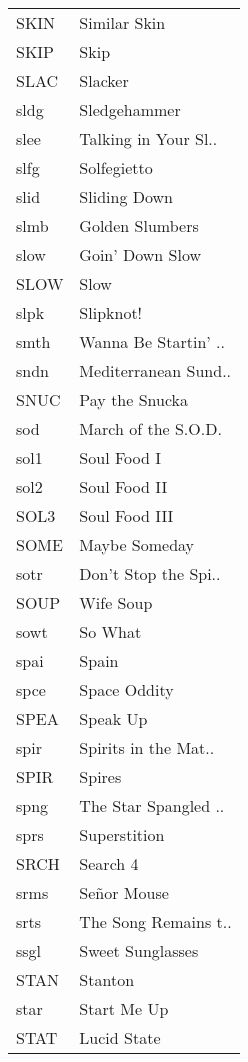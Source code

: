 \begin{supertabular}{ll}
 SKIN &          Similar Skin \\
 SKIP &                  Skip \\
 SLAC &               Slacker \\
 sldg &          Sledgehammer \\
 slee &  Talking in Your Sl.. \\
 slfg &           Solfegietto \\
 slid &          Sliding Down \\
 slmb &       Golden Slumbers \\
 slow &       Goin' Down Slow \\
 SLOW &                  Slow \\
 slpk &             Slipknot! \\
 smth &  Wanna Be Startin' .. \\
 sndn &  Mediterranean Sund.. \\
 SNUC &        Pay the Snucka \\
  sod &   March of the S.O.D. \\
 sol1 &           Soul Food I \\
 sol2 &          Soul Food II \\
 SOL3 &         Soul Food III \\
 SOME &         Maybe Someday \\
 sotr &  Don't Stop the Spi.. \\
 SOUP &             Wife Soup \\
 sowt &               So What \\
 spai &                 Spain \\
 spce &          Space Oddity \\
 SPEA &              Speak Up \\
 spir &  Spirits in the Mat.. \\
 SPIR &                Spires \\
 spng &  The Star Spangled .. \\
 sprs &          Superstition \\
 SRCH &              Search 4 \\
 srms &           Señor Mouse \\
 srts &  The Song Remains t.. \\
 ssgl &      Sweet Sunglasses \\
 STAN &               Stanton \\
 star &           Start Me Up \\
 STAT &           Lucid State \\

\end{supertabular}
